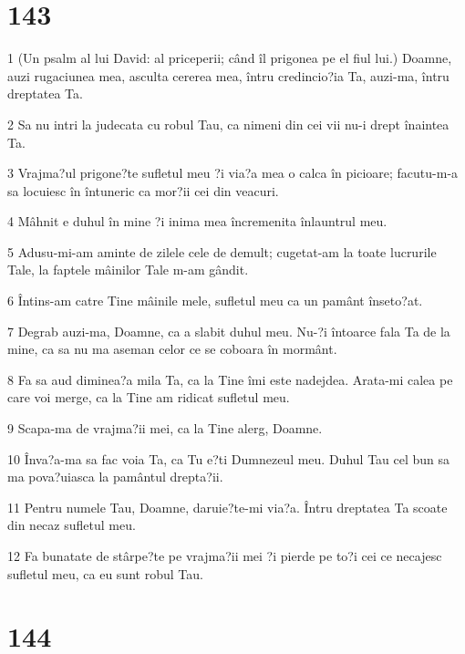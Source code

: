 \chapter{143}

\par 1 (Un psalm al lui David: al priceperii; când îl prigonea pe el fiul lui.) Doamne, auzi rugaciunea mea, asculta cererea mea, întru credincio?ia Ta, auzi-ma, întru dreptatea Ta.
\par 2 Sa nu intri la judecata cu robul Tau, ca nimeni din cei vii nu-i drept înaintea Ta.
\par 3 Vrajma?ul prigone?te sufletul meu ?i via?a mea o calca în picioare; facutu-m-a sa locuiesc în întuneric ca mor?ii cei din veacuri.
\par 4 Mâhnit e duhul în mine ?i inima mea încremenita înlauntrul meu.
\par 5 Adusu-mi-am aminte de zilele cele de demult; cugetat-am la toate lucrurile Tale, la faptele mâinilor Tale m-am gândit.
\par 6 Întins-am catre Tine mâinile mele, sufletul meu ca un pamânt înseto?at.
\par 7 Degrab auzi-ma, Doamne, ca a slabit duhul meu. Nu-?i întoarce fala Ta de la mine, ca sa nu ma aseman celor ce se coboara în mormânt.
\par 8 Fa sa aud diminea?a mila Ta, ca la Tine îmi este nadejdea. Arata-mi calea pe care voi merge, ca la Tine am ridicat sufletul meu.
\par 9 Scapa-ma de vrajma?ii mei, ca la Tine alerg, Doamne.
\par 10 Înva?a-ma sa fac voia Ta, ca Tu e?ti Dumnezeul meu. Duhul Tau cel bun sa ma pova?uiasca la pamântul drepta?ii.
\par 11 Pentru numele Tau, Doamne, daruie?te-mi via?a. Întru dreptatea Ta scoate din necaz sufletul meu.
\par 12 Fa bunatate de stârpe?te pe vrajma?ii mei ?i pierde pe to?i cei ce necajesc sufletul meu, ca eu sunt robul Tau.

\chapter{144}

